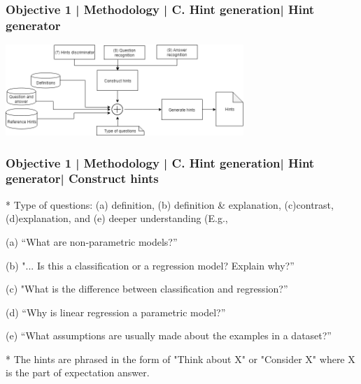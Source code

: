 \documentclass{beamer}
\begin{document}
\begin{frame}
\frametitle{Objective 1 | Methodology | C. Hint generation| Hint generator}
	\includegraphics[width=90mm]{hints3.png}
\end{frame}
\begin{frame}
\frametitle{Objective 1 | Methodology | C. Hint generation| Hint generator| Construct hints}
 * Type of questions: (a) definition, (b) definition \& explanation, (c)contrast, (d)explanation, and (e) deeper understanding (E.g.,
 \begin{itemize}
 {\scriptsize 	\item (a) “What are non-parametric models?” 	
 	\item (b) "... Is this a classification or a regression model? Explain why?”
 	\item (c) "What is the difference between classification and regression?” 	
 	\item (d) “Why is linear regression a parametric model?”
 	\item (e) “What assumptions are usually made about the examples in a dataset?”
 	}
 \end{itemize}
* The hints are phrased in the form of "Think about X" or "Consider X" where X is the part of expectation answer. \\

\end{frame}
\end{document}

